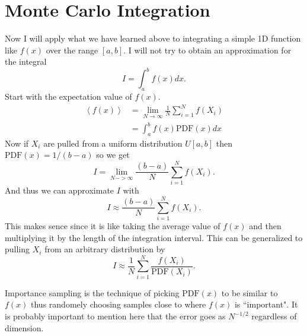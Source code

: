\documentclass[12pt]{extarticle}
\newcommand{\PDF}{\mathrm{PDF}}
\begin{document}


\section{Monte Carlo Integration}
Now I will apply what we have learned above to integrating a simple 1D function like $f(x)$ over the range $[a,b]$. I will not try to obtain an approximation for the integral
\begin{equation}
  I = \int_a^b f(x) dx.
\end{equation}
Start with the expectation value of $f(x)$.
\begin{align}
  \left< f(x) \right> &= \lim_{N \rightarrow \infty} \frac{1}{N} \sum_{i=1}^N f(X_i) \\
  &= \int_a^b f(x) \PDF(x) dx
\end{align}
Now if $X_i$ are pulled from a uniform distribution $U[a,b]$ then $\PDF(x)=1/(b-a)$ so we get
\begin{equation}
  I = \lim_{N->\infty} \frac{(b-a)}{N} \sum_{i=1}^N f(X_i).
\end{equation}
And thus we can approximate $I$ with
\begin{equation}
  I \approx \frac{(b-a)}{N} \sum_{i=1}^N f(X_i).
\end{equation}
This makes sence since it is like taking the average value of $f(x)$ and then multiplying it by the length of the integration interval.
This can be generalized to pulling $X_i$ from an arbitrary distribution by
\begin{equation}
  I \approx \frac{1}{N} \sum_{i=1}^N \frac{f(X_i)}{\PDF(X_i)}.
  \label{equ:mcint}
\end{equation}

Importance sampling is the technique of picking $\PDF(x)$ to be similar to $f(x)$ thus randomely choosing samples close to where $f(x)$ is ``important". It is probably important to mention here that the error goes as $N^{-1/2}$ regardless of dimension.
\end{document}
